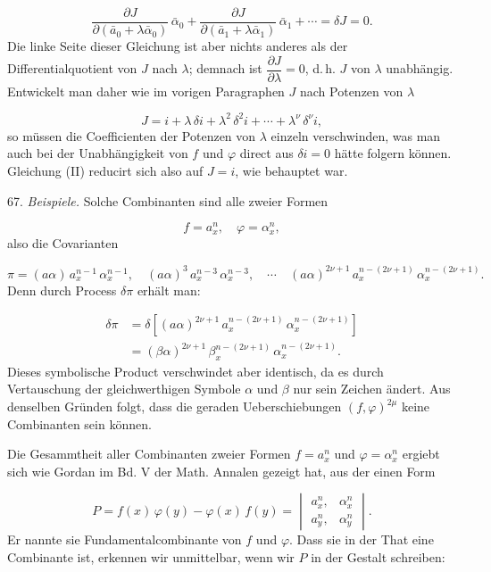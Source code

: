 \documentclass[11pt]{article}
\providecommand{\gesperrt}[1]{\textls[130]{#1}}
\providecommand{\weq}[2]{\begin{equation}\tag{#1}#2\end{equation}}
\begin{document}
\[
\frac{\partial J}{\partial(\bar a_0 + \lambda \bar \alpha_0)}\, \bar \alpha_0 + \frac{\partial J}{\partial(\bar a_1 + \lambda \bar \alpha_1)}\, \bar \alpha_1 + \cdots = \delta J = 0 .
\]
Die linke Seite dieser Gleichung ist aber nichts anderes als der Differentialquotient von $J$ nach $\lambda$; demnach ist $\dfrac{\partial J}{\partial \lambda} = 0$, d.\,h. $J$ von $\lambda$ unabhängig. Entwickelt man daher wie im vorigen Paragraphen $J$ nach Potenzen von $\lambda$

\weq{II}{
J = i + \lambda\,\delta i + \lambda^2\,\delta^2 i + \cdots + \lambda^\nu\,\delta^\nu i ,
}
so müssen die Coefficienten der Potenzen von $\lambda$ einzeln verschwinden, was man auch bei der Unabhängigkeit von $f$ und $\varphi$ direct aus $\delta i = 0$ hätte folgern können. Gleichung (II) reducirt sich also auf $J = i$, wie behauptet war.

67. \textit{Beispiele.} Solche Combinanten sind alle \gesperrt{ungeraden Ueberschiebungen} zweier Formen

\[
f = a_x^n, \quad \varphi = \alpha_x^n ,
\]
also die Covarianten

\[
\pi = (a\alpha)\, a_x^{n-1}\, \alpha_x^{n-1}, \quad (a\alpha)^3\, a_x^{n-3}\, \alpha_x^{n-3}, \quad \cdots \quad (a\alpha)^{2\nu+1}\, a_x^{n-(2\nu+1)}\, \alpha_x^{n-(2\nu+1)} .
\]
Denn durch Process $\delta \pi$ erhält man:

\[
\begin{aligned}
\delta \pi &= \delta\!\left[(a\alpha)^{2\nu+1}\, a_x^{n-(2\nu+1)}\, \alpha_x^{n-(2\nu+1)}\right]\\
&= (\beta\alpha)^{2\nu+1}\, \beta_x^{n-(2\nu+1)}\, \alpha_x^{n-(2\nu+1)} .
\end{aligned}
\]
Dieses symbolische Product verschwindet aber identisch, da es durch Vertauschung der gleichwerthigen Symbole $\alpha$ und $\beta$ nur sein Zeichen ändert. Aus denselben Gründen folgt, dass die geraden Ueberschiebungen $(f, \varphi)^{2\mu}$ keine Combinanten sein können.

Die Gesammtheit aller Combinanten zweier Formen $f = a_x^n$ und $\varphi = \alpha_x^n$ ergiebt sich wie Gordan im Bd. V der Math. Annalen gezeigt hat, aus der einen Form

\[
P = f(x)\,\varphi(y) - \varphi(x)\,f(y) = \begin{vmatrix} a_x^n, & \alpha_x^n \\ a_y^n, & \alpha_y^n \end{vmatrix} .
\]
Er nannte sie \glqq{}Fundamentalcombinante\grqq{} von $f$ und $\varphi$. Dass sie in der That eine Combinante ist, erkennen wir unmittelbar, wenn wir $P$ in der Gestalt schreiben:
\end{document}
